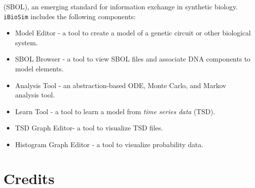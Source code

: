 \documentclass[titlepage,11pt]{article}
\begin{document}
(SBOL), an emerging standard for information exchange in synthetic biology.
{\tt iBioSim} includes the following components: 
\begin{itemize}
\item Model Editor - a tool to create a model of a genetic circuit or other biological system.
\item SBOL Browser - a tool to view SBOL files and associate DNA components to model elements.
\item Analysis Tool - an abstraction-based ODE, Monte Carlo, and Markov analysis tool.
\item Learn Tool - a tool to learn a model from \emph{time series data} (TSD).
\item TSD Graph Editor- a tool to visualize TSD files. 
\item Histogram Graph Editor - a tool to visualize probability data. 
\end{itemize}

\section*{Credits}
\end{document}
